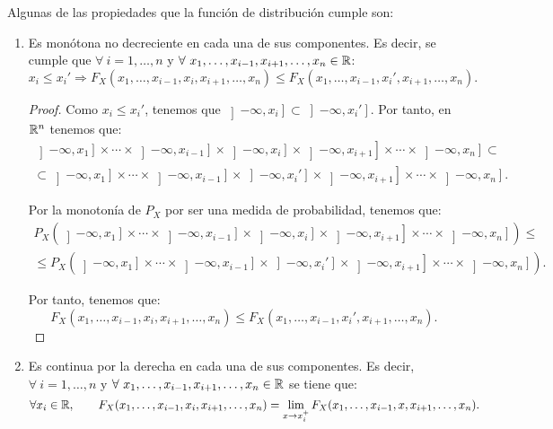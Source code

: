 Algunas de las propiedades que la función de distribución cumple son:
\begin{enumerate}
    \item Es monótona no decreciente en cada una de sus componentes. Es decir, se cumple que $\forall~i=1, \ldots, n$ y $\forall~x_1, \dots, x_{i-1}, x_{i+1}, \dots, x_n \in \mathbb{R}$:
    \begin{equation*}
        x_i \leq x_i'
        \Longrightarrow
        F_X(x_1, \ldots, x_{i-1}, x_i, x_{i+1}, \ldots, x_n) \leq F_X(x_1, \ldots, x_{i-1}, x_i', x_{i+1}, \ldots, x_n).
    \end{equation*}
    \begin{proof}
        Como $x_i\leq x_i'$, tenemos que $\left]-\infty, x_i\right]\subset \left]-\infty, x_i'\right]$.
        Por tanto, en $\mathbb{R}^n$ tenemos que:
        \begin{multline*}
            \left]-\infty, x_1\right]\times \cdots \times \left]-\infty, x_{i-1}\right]\times \left]-\infty, x_i\right]\times \left]-\infty, x_{i+1}\right]\times \cdots \times \left]-\infty, x_n\right] \subset\\\subset \left]-\infty, x_1\right]\times \cdots \times \left]-\infty, x_{i-1}\right]\times \left]-\infty, x_i'\right]\times \left]-\infty, x_{i+1}\right]\times \cdots \times \left]-\infty, x_n\right].
        \end{multline*}

        Por la monotonía de $P_X$ por ser una medida de probabilidad, tenemos que:
        \begin{multline*}
            P_X\left(\left]-\infty, x_1\right]\times \cdots \times \left]-\infty, x_{i-1}\right]\times \left]-\infty, x_i\right]\times \left]-\infty, x_{i+1}\right]\times \cdots \times \left]-\infty, x_n\right]\right) \leq\\ \leq P_X\left(\left]-\infty, x_1\right]\times \cdots \times \left]-\infty, x_{i-1}\right]\times \left]-\infty, x_i'\right]\times \left]-\infty, x_{i+1}\right]\times \cdots \times \left]-\infty, x_n\right]\right).
        \end{multline*}

        Por tanto, tenemos que:
        \begin{equation*}
            F_X(x_1, \ldots, x_{i-1}, x_i, x_{i+1}, \ldots, x_n) \leq F_X(x_1, \ldots, x_{i-1}, x_i', x_{i+1}, \ldots, x_n).
        \end{equation*}
    \end{proof}

    \item Es continua por la derecha en cada una de sus componentes. Es decir, $\forall~i=1, \ldots, n$ y $\forall~x_1, \dots, x_{i-1}, x_{i+1}, \dots, x_n \in \mathbb{R}$ se tiene que:
    \begin{equation*}
        \forall x_i\in \mathbb{R},\qquad F_X(x_1, \ldots, x_{i-1}, x_i, x_{i+1}, \ldots, x_n) = \lim_{x\to x_i^+} F_X(x_1, \ldots, x_{i-1}, x, x_{i+1}, \ldots, x_n).
    \end{equation*}


\end{enumerate}
